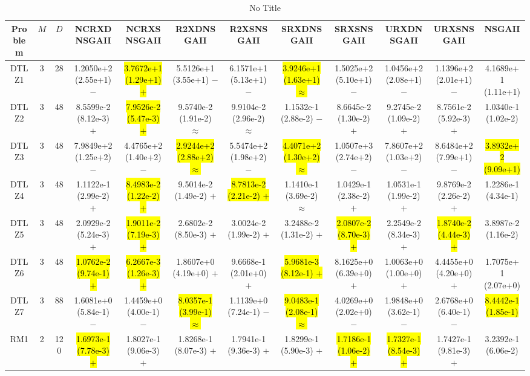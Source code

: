 \documentclass[journal]{IEEEtran}
\begin{document}
\begin{table*}[htbp]
\renewcommand{\arraystretch}{1.2}
\centering
\caption{No Title}
\begin{tabular}{cccccccccccc}
\toprule
Problem&$M$&$D$&NCRXDNSGAII&NCRXSNSGAII&R2XDNSGAII&R2XSNSGAII&SRXDNSGAII&SRXSNSGAII&URXDNSGAII&URXSNSGAII&NSGAII\\
\midrule
\multirow{1}{*}{DTLZ1}&3&28&1.2050e+2 (2.55e+1) $-$&\hl{3.7672e+1 (1.29e+1) $+$}&5.5126e+1 (3.55e+1) $-$&6.1571e+1 (5.13e+1) $-$&\hl{3.9246e+1 (1.63e+1) $\approx$}&1.5025e+2 (5.10e+1) $-$&1.0456e+2 (2.08e+1) $-$&1.1396e+2 (2.01e+1) $-$&4.1689e+1 (1.11e+1)\\
\hline
\multirow{1}{*}{DTLZ2}&3&48&8.5599e-2 (8.12e-3) $+$&\hl{7.9526e-2 (5.47e-3) $+$}&9.5740e-2 (1.91e-2) $\approx$&9.9104e-2 (2.96e-2) $\approx$&1.1532e-1 (2.88e-2) $-$&8.6645e-2 (1.30e-2) $+$&9.2745e-2 (1.09e-2) $+$&8.7561e-2 (5.92e-3) $+$&1.0340e-1 (1.02e-2)\\
\hline
\multirow{1}{*}{DTLZ3}&3&48&7.9849e+2 (1.25e+2) $-$&4.4765e+2 (1.40e+2) $-$&\hl{2.9244e+2 (2.88e+2) $\approx$}&5.5474e+2 (1.98e+2) $-$&\hl{4.4071e+2 (1.30e+2) $\approx$}&1.0507e+3 (2.74e+2) $-$&7.8607e+2 (1.03e+2) $-$&8.6484e+2 (7.99e+1) $-$&\hl{3.8932e+2 (9.09e+1)}\\
\hline
\multirow{1}{*}{DTLZ4}&3&48&1.1122e-1 (2.99e-2) $+$&\hl{8.4983e-2 (1.22e-2) $+$}&9.5014e-2 (1.49e-2) $+$&\hl{8.7813e-2 (2.21e-2) $+$}&1.1410e-1 (3.69e-2) $\approx$&1.0429e-1 (2.38e-2) $+$&1.0531e-1 (1.99e-2) $+$&9.8769e-2 (2.26e-2) $+$&1.2286e-1 (4.34e-1)\\
\hline
\multirow{1}{*}{DTLZ5}&3&48&2.0929e-2 (5.24e-3) $+$&\hl{1.9011e-2 (7.19e-3) $+$}&2.6802e-2 (8.50e-3) $+$&3.0024e-2 (1.99e-2) $+$&3.2488e-2 (1.31e-2) $+$&\hl{2.0807e-2 (8.70e-3) $+$}&2.2549e-2 (8.34e-3) $+$&\hl{1.8740e-2 (4.44e-3) $+$}&3.8987e-2 (1.16e-2)\\
\hline
\multirow{1}{*}{DTLZ6}&3&48&\hl{1.0762e-2 (9.74e-1) $+$}&\hl{6.2667e-3 (1.26e-3) $+$}&1.8607e+0 (4.19e+0) $+$&9.6668e-1 (2.01e+0) $+$&\hl{5.9681e-3 (8.12e-1) $+$}&8.1625e+0 (6.39e+0) $+$&1.0063e+0 (1.00e+0) $+$&4.4455e+0 (4.20e+0) $+$&1.7075e+1 (2.07e+0)\\
\hline
\multirow{1}{*}{DTLZ7}&3&88&1.6081e+0 (5.84e-1) $-$&1.4459e+0 (4.00e-1) $-$&\hl{8.0357e-1 (3.99e-1) $\approx$}&1.1139e+0 (7.24e-1) $-$&\hl{9.0483e-1 (2.08e-1) $\approx$}&4.0269e+0 (2.02e+0) $-$&1.9848e+0 (3.62e-1) $-$&2.6768e+0 (6.40e-1) $-$&\hl{8.4442e-1 (1.85e-1)}\\
\hline
\multirow{1}{*}{RM1}&2&120&\hl{1.6973e-1 (7.78e-3) $+$}&1.8027e-1 (9.06e-3) $+$&1.8268e-1 (8.07e-3) $+$&1.7941e-1 (9.36e-3) $+$&1.8299e-1 (5.90e-3) $+$&\hl{1.7186e-1 (1.06e-2) $+$}&\hl{1.7327e-1 (8.54e-3) $+$}&1.7427e-1 (9.81e-3) $+$&3.2392e-1 (6.06e-2)\\

\end{tabular}
\end{table*}
\end{document}
